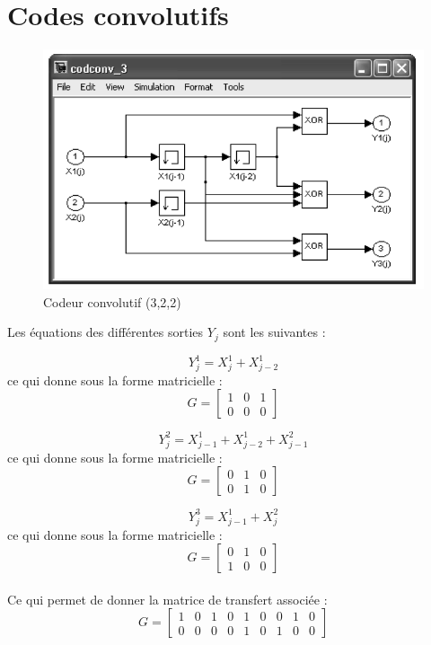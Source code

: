 \documentclass[a4paper, 12pt]{article}
\begin{document}
\section{Codes convolutifs}

\begin{figure}[H]
	\centering
	\includegraphics[scale=0.8]{../codeur_convolutif_exo.png}
	\caption{Codeur convolutif (3,2,2)}
	\label{fig:cod_convolutif}
\end{figure}

Les équations des différentes sorties $Y_j$ sont les suivantes :

\[ Y_j^1 = X_{j}^1 + X_{j-2}^1 \]
ce qui donne sous la forme matricielle :
\[ G = \begin{bmatrix} 1 & 0 & 1 \\ 0 & 0 & 0 \end{bmatrix} \] 

\[ Y_j^2 = X_{j-1}^1 + X_{j-2}^1 + X_{j-1}^2 \]
ce qui donne sous la forme matricielle :
\[ G = \begin{bmatrix} 0 & 1 & 0 \\ 0 & 1 & 0 \end{bmatrix} \]

\[ Y_j^3 =  X_{j-1}^1 + X_{j}^2 \]
ce qui donne sous la forme matricielle :
\[ G = \begin{bmatrix} 0 & 1 & 0 \\ 1 & 0 & 0 \end{bmatrix} \] \\

Ce qui permet de donner la matrice de transfert associée :
\[ G = \begin{bmatrix} 1 & 0 & 1 & 0 & 1 & 0 & 0 & 1 & 0 \\ 0 & 0 & 0 & 0 & 1 & 0 & 1 & 0 & 0 \end{bmatrix} \] \\
\end{document}
